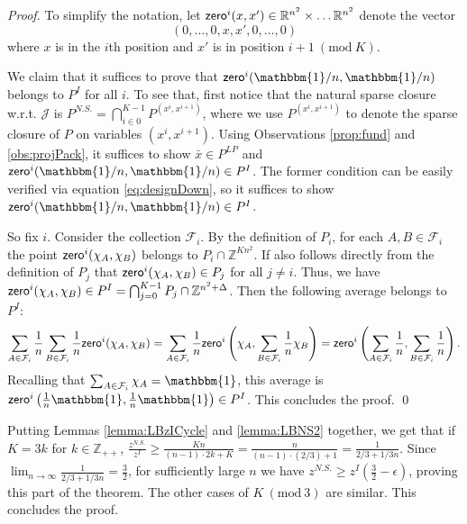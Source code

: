 \documentclass[smallextended]{svjour3}
\begin{document}
	\begin{proof}	
		To simplify the notation, let ${{\sf zero}}^i(x,x') \in {\mathbb{R}}^{n^2} \times \ldots {\mathbb{R}}^{n^2}$ denote the vector $$(0, \ldots, 0, x, x', 0, \ldots, 0)$$ where $x$ is in the $i$th position and $x'$ is in position $i + 1 {\ (\text{mod}\ {K})}$.
		 
		We claim that it suffices to prove that ${{\sf zero}}^i({\mathbbm{1}}/n, {\mathbbm{1}}/n)$ belongs to $P^I$ for all $i$. To see that, first notice that the natural sparse closure w.r.t. ${\mathcal{J}}$ is 	$P^{N.S.} = \bigcap_{i \in 0}^{K-1} P^{(x^i,x^{i+1})}$, where we use $P^{(x^i,x^{i+1})}$ to denote the sparse closure of $P$ on variables $(x^i,x^{i+1})$.
Using Observations \ref{prop:fund} and \ref{obs:projPack}, it suffices to show $\bar{x} \in P^{LP}$ and ${{\sf zero}}^i({\mathbbm{1}}/n, {\mathbbm{1}}/n) \in P^I$. The former condition can be easily verified via equation \eqref{eq:designDown}, so it suffices to show ${{\sf zero}}^i({\mathbbm{1}}/n,{\mathbbm{1}}/n) \in P^I$.
				
		So fix $i$. Consider the collection ${\mathcal{F}}_i$. By the definition of $P_i$, for each $A,B \in {\mathcal{F}}_i$ the point ${{\sf zero}}^i(\chi_A, \chi_B)$ belongs to $P_i \cap {\mathbb{Z}}^{K n^2}$. If also follows directly from the definition of $P_j$ that ${{\sf zero}}^i(\chi_A, \chi_B) \in P_j$ for all $j \neq i$. Thus, we have ${{\sf zero}}^i(\chi_A, \chi_B) \in P^I = \bigcap_{j = 0}^{K-1} P_j \cap {\mathbb{Z}}^{n^2 + \Delta}$. Then the following average belongs to $P^I$:
				\begin{align*}
			\sum_{A \in {\mathcal{F}}_i} \frac{1}{n} \sum_{B \in {\mathcal{F}}_i} \frac{1}{n} {{\sf zero}}^i(\chi_A, \chi_B) =	\sum_{A \in {\mathcal{F}}_i} \frac{1}{n} {{\sf zero}}^i\left(\chi_A, \sum_{B \in {\mathcal{F}}_i} \frac{1}{n} \chi_B\right) = {{\sf zero}}^i\left(\sum_{A \in {\mathcal{F}}_i} \frac{1}{n}, \sum_{B \in {\mathcal{F}}_i} \frac{1}{n}  \right).
		\end{align*}	
		Recalling that $\sum_{A \in {\mathcal{F}}_i} \chi_A = {\mathbbm{1}}$, this average is ${{\sf zero}}^i\left(\frac{1}{n} {\mathbbm{1}}, \frac{1}{n} {\mathbbm{1}}\right) \in P^I$. This concludes the proof.{
\ifmp
	\hfill \qed
\fi
}
	\end{proof}

	Putting Lemmas \ref{lemma:LBzICycle} and \ref{lemma:LBNS2} together, we get that if $K = 3k$ for $k \in {\mathbb{Z}}_{++}$, $\frac{z^{N.S.}}{z^I} \ge \frac{Kn}{(n-1) \cdot 2k + K} = \frac{n}{(n-1) \cdot (2/3) + 1} = \frac{1}{2/3 + 1/3n}$. Since $\lim_{n \rightarrow \infty} \frac{1}{2/3 + 1/3n} = \frac{3}{2}$, for sufficiently large $n$ we have $z^{N.S.} \ge z^I (\frac{3}{2} - \epsilon)$, proving this part of the theorem. The other cases of $K {\ (\text{mod}\ {3})}$ are similar. This concludes the proof. 
 
\end{document}
